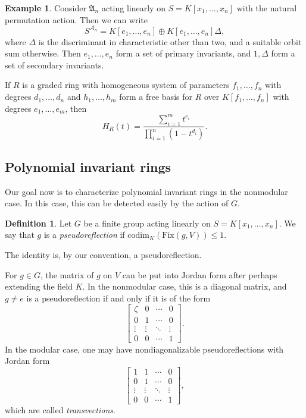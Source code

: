 \documentclass[12pt]{amsart}
\theoremstyle{definition}
\newtheorem{definition}[theorem]{Definition}
\newtheorem{example}[theorem]{Example}
\numberwithin{equation}{theorem}
\begin{document}
\begin{example}
Consider $\mathfrak{A}_n$ acting linearly on $S=K[x_1,\dots,x_n]$ with the natural permutation action. Then we can write
\[ S^{\mathcal{A}_n} = K[e_1,\dots,e_n] \oplus K[e_1,\dots,e_n] \Delta,\]
where $\Delta$ is the discriminant in characteristic other than two, and a suitable orbit sum otherwise.
Then $e_1,\dots,e_n$ form a set of primary invariants, and $1,\Delta$ form a set of secondary invariants.
\end{example}

 
If $R$ is a graded ring with homogeneous system of parameters $f_1,\dots,f_n$ with degrees $d_1,\dots,d_n$ and $h_1,\dots,h_m$ form a free basis for $R$ over $K[f_1,\dots,f_n]$ with degrees $e_1,\dots,e_m$, then
\[ H_R(t) = \frac{ \sum_{i=1}^m t^{e_i} }{\prod_{i=1}^n (1-t^{d_i})}.\]

 

 
 
 \subsection*{Polynomial invariant rings} Our goal now is to characterize polynomial invariant rings in the nonmodular case. In this case, this can be detected easily by the action of $G$.
 
\begin{definition}
Let $G$ be a finite group acting linearly on $S=K[x_1,\dots,x_n]$. We say that $g$ is a \emph{pseudoreflection} if $\mathrm{codim}_K( \mathrm{Fix}(g,V) ) \leq 1$.
\end{definition}

The identity is, by our convention, a pseudoreflection.

For $g\in G$, the matrix of $g$ on $V$ can be put into Jordan form after perhaps extending the field $K$. In the nonmodular case, this is a diagonal matrix, and $g\neq e$ is a pseudoreflection if and only if it is of the form
\[ \begin{bmatrix} \zeta & 0  & \cdots & 0 \\ 0 & 1  & \cdots & 0 \\  \vdots & \vdots  & \ddots & \vdots  \\ 0 & 0 & \cdots & 1 \end{bmatrix}.\]
In the modular case, one may have nondiagonalizable pseudoreflections with Jordan form 
\[ \begin{bmatrix} 1 & 1  & \cdots & 0 \\ 0 & 1  & \cdots & 0 \\  \vdots & \vdots  & \ddots & \vdots  \\ 0 & 0 & \cdots & 1 \end{bmatrix},\]
which are called \emph{transvections}.
\end{document}
